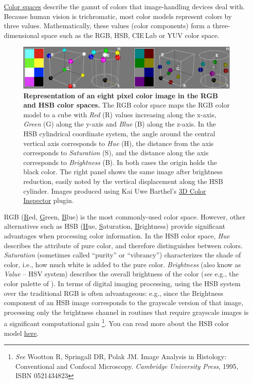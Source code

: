 \href{http://en.wikipedia.org/wiki/Color_space}{Color spaces} describe
the gamut of colors that image-handling devices deal with. Because
human vision is trichromatic, most color models represent colors by
three values. Mathematically, these values (color components) form
a three-dimensional space such as the RGB, HSB,
CIE\,Lab or YUV color space. 
\begin{figure}[h]
\noindent \includegraphics[width=1\columnwidth]{images/RGB-HSBcolorModels}\caption[RGB and HSB color models]{\textbf{\label{fig:ColorModels}Representation of an eight pixel
color image in the RGB and HSB color spaces.} The RGB color space
maps the RGB color model to a cube with \emph{Red} (R) values increasing
along the x-axis, \emph{Green} (G) along the y-axis and \emph{Blue}
(B) along the z-axis. In the HSB cylindrical coordinate system, the
angle around the central vertical axis corresponds to \emph{Hue} (H),
the distance from the axis corresponds to \emph{Saturation} (S), and
the distance along the axis corresponds to \emph{Brightness} (B).
In both cases the origin holds the black color. The right panel shows
the same image after brightness reduction, easily noted by the vertical
displacement along the HSB cylinder. Images produced using Kai Uwe
Barthel's \protect\href{http://www.f4.fhtw-berlin.de/~barthel/ImageJ/ColorInspector//help.htm}{3D Color Inspector}
plugin.}
\end{figure}


RGB (\uline{R}ed, \uline{G}reen, \uline{B}lue) is the most
commonly-used color space. However, other alternatives such as HSB
(\uline{H}ue, \uline{S}aturation, \uline{B}rightness) provide
significant advantages when processing color information. In the HSB
color space, \emph{Hue} describes the attribute of pure color, and
therefore distinguishes between colors. \emph{Saturation} (sometimes
called ``purity'' or ``vibrancy'') characterizes the shade of
color, i.e., how much white is added to the pure color.\emph{ Brightness}
(also know as \emph{Value} -- HSV system) describes the overall brightness
of the color (\emph{see} e.g., the color palette of ).
In terms of digital imaging processing, using the HSB system over
the traditional RGB is often advantageous: e.g., since the Brightness
component of an HSB image corresponds to the grayscale version of
that image, processing only the brightness channel in routines that
require grayscale images is a significant computational gain%
\footnote{\emph{See} Wootton R, Springall DR, Polak JM. Image Analysis in Histology:
Conventional and Confocal Microscopy. \emph{Cambridge University Press},
1995\emph{,} ISBN 0521434823%
}. You can read more about the HSB color model \href{http://en.wikipedia.org/wiki/HSB_color_space}{here}.

